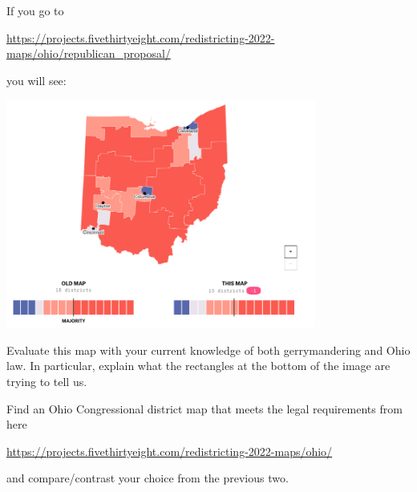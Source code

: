 \documentclass[noauthor,nooutcomes,hints,handout]{ximera}
\begin{document}
\begin{question}
  If you go to
  \begin{center}
  \url{https://projects.fivethirtyeight.com/redistricting-2022-maps/ohio/republican_proposal/}
  \end{center}
  you will see:
  \begin{center}
    \includegraphics[width=4in]{repProp.png}
  \end{center}
  Evaluate this map with your current knowledge of both gerrymandering
  and Ohio law.  In particular, explain what the rectangles at the
  bottom of the image are trying to tell us.
\end{question}



\mynewpage

\begin{question}
  Find an Ohio Congressional district map that meets the legal
  requirements from here
  \begin{center}
    \url{https://projects.fivethirtyeight.com/redistricting-2022-maps/ohio/}
  \end{center}
  and compare/contrast your choice from the previous two.
\end{question}
\end{document}
